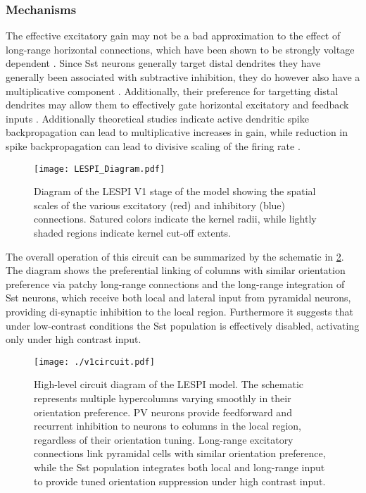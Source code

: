 \subsubsection{Mechanisms}

The effective excitatory gain may not be a bad approximation to the
effect of long-range horizontal connections, which have been shown to
be strongly voltage dependent \citep{Hirsch1991}. Since Sst neurons
generally target distal dendrites they have generally been associated
with subtractive inhibition, they do however also have a
multiplicative component \citep{Wilson2012}. Additionally, their
preference for targetting distal dendrites may allow them to
effectively gate horizontal excitatory and feedback inputs
\citep{Ma2011, Gentet2012}. Additionally theoretical studies indicate
active dendritic spike backpropagation can lead to multiplicative
increases in gain, while reduction in spike backpropagation can lead
to divisive scaling of the firing rate \citep{Mehaffey2005}.

\begin{figure}
	\centering
        \texttt{[image: LESPI\_Diagram.pdf]}
	\caption{Diagram of the LESPI V1 stage of the model showing the
          spatial scales of the various excitatory (red) and
          inhibitory (blue) connections. Satured colors indicate the
          kernel radii, while lightly shaded regions indicate kernel
          cut-off extents.}
	\label{LESPIDiagram}
\end{figure}

The overall operation of this circuit can be summarized by the
schematic in \ref{circuit_diagram}. The diagram shows the preferential
linking of columns with similar orientation preference via patchy
long-range connections and the long-range integration of Sst neurons,
which receive both local and lateral input from pyramidal neurons,
providing di-synaptic inhibition to the local region. Furthermore it
suggests that under low-contrast conditions the Sst population is
effectively disabled, activating only under high contrast input.

\begin{figure}
	\centering
	\texttt{[image: ./v1circuit.pdf]}
	\caption[High-level circuit diagram of the LESPI
      model.]{High-level circuit diagram of the LESPI model. The
      schematic represents multiple hypercolumns varying smoothly in
      their orientation preference. PV neurons provide feedforward and
      recurrent inhibition to neurons to columns in the local region,
      regardless of their orientation tuning. Long-range excitatory
      connections link pyramidal cells with similar orientation
      preference, while the Sst population integrates both local and
      long-range input to provide tuned orientation suppression under
      high contrast input.}
    \label{circuit_diagram}
\end{figure}


